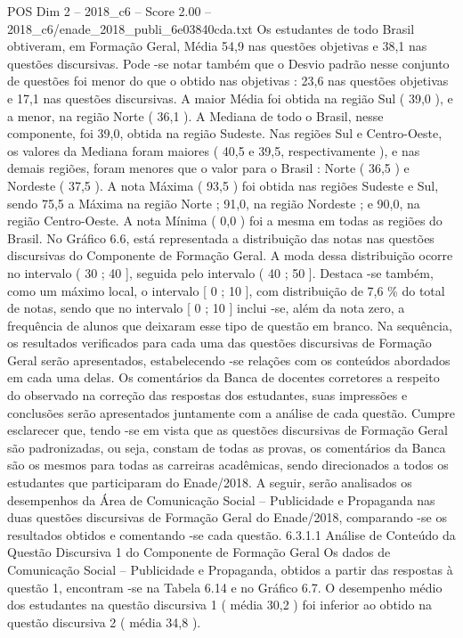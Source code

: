 \begin{textsample}{POS Dim 2 – 2018\_c6 – Score 2.00 – 2018\_c6/enade\_2018\_publi\_6e03840cda.txt}
Os estudantes de todo Brasil obtiveram, em Formação Geral, Média 54,9 nas questões objetivas e 38,1 nas questões discursivas.
Pode -se notar também que o Desvio padrão nesse conjunto de questões foi menor do que o obtido nas objetivas : 23,6 nas questões objetivas e 17,1 nas questões discursivas.
A maior Média foi obtida na região Sul ( 39,0 ), e a menor, na região Norte ( 36,1 ).
A Mediana de todo o Brasil, nesse componente, foi 39,0, obtida na região Sudeste.
Nas regiões Sul e Centro-Oeste, os valores da Mediana foram maiores ( 40,5 e 39,5, respectivamente ), e nas demais regiões, foram menores que o valor para o Brasil : Norte ( 36,5 ) e Nordeste ( 37,5 ).
A nota Máxima ( 93,5 ) foi obtida nas regiões Sudeste e Sul, sendo 75,5 a Máxima na região Norte ; 91,0, na região Nordeste ; e 90,0, na região Centro-Oeste.
A nota Mínima ( 0,0 ) foi a mesma em todas as regiões do Brasil.
No Gráfico 6.6, está representada a distribuição das notas nas questões discursivas do Componente de Formação Geral.
A moda dessa distribuição ocorre no intervalo ( 30 ; 40 ], seguida pelo intervalo ( 40 ; 50 ].
Destaca -se também, como um máximo local, o intervalo [ 0 ; 10 ], com distribuição de 7,6 \% do total de notas, sendo que no intervalo [ 0 ; 10 ] inclui -se, além da nota zero, a frequência de alunos que deixaram esse tipo de questão em branco.
Na sequência, os resultados verificados para cada uma das questões discursivas de Formação Geral serão apresentados, estabelecendo -se relações com os conteúdos abordados em cada uma delas.
Os comentários da Banca de docentes corretores a respeito do observado na correção das respostas dos estudantes, suas impressões e conclusões serão apresentados juntamente com a análise de cada questão.
Cumpre esclarecer que, tendo -se em vista que as questões discursivas de Formação Geral são padronizadas, ou seja, constam de todas as provas, os comentários da Banca são os mesmos para todas as carreiras acadêmicas, sendo direcionados a todos os estudantes que participaram do Enade/2018.
A seguir, serão analisados os desempenhos da Área de Comunicação Social – Publicidade e Propaganda nas duas questões discursivas de Formação Geral do Enade/2018, comparando -se os resultados obtidos e comentando -se cada questão. 6.3.1.1 Análise de Conteúdo da Questão Discursiva 1 do Componente de Formação Geral Os dados de Comunicação Social – Publicidade e Propaganda, obtidos a partir das respostas à questão 1, encontram -se na Tabela 6.14 e no Gráfico 6.7.
O desempenho médio dos estudantes na questão discursiva 1 ( média 30,2 ) foi inferior ao obtido na questão discursiva 2 ( média 34,8 ).

\end{textsample}
